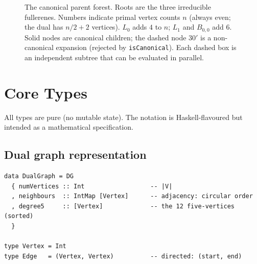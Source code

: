 \documentclass[11pt,a4paper]{article}
\theoremstyle{definition}
\begin{document}
\begin{figure}[ht]
\caption{The canonical parent forest.  Roots are the three irreducible
fullerenes.  Numbers indicate primal vertex counts $n$ (always even;
the dual has $n/2+2$ vertices).  $L_0$ adds $4$ to $n$; $L_1$ and
$B_{0,0}$ add $6$.  Solid nodes are canonical children; the dashed
node $30'$ is a non-canonical expansion (rejected by
\texttt{isCanonical}).  Each dashed box is an independent subtree
that can be evaluated in parallel.}
\label{fig:forest}
\end{figure}

\section{Core Types}
\label{sec:types}

All types are pure (no mutable state).  The notation is
Haskell-flavoured but intended as a mathematical specification.

\subsection{Dual graph representation}

\begin{lstlisting}
data DualGraph = DG
  { numVertices :: Int                  -- |V|
  , neighbours  :: IntMap [Vertex]      -- adjacency: circular order
  , degree5     :: [Vertex]             -- the 12 five-vertices (sorted)
  }

type Vertex = Int
type Edge   = (Vertex, Vertex)          -- directed: (start, end)
\end{lstlisting}
\end{document}
